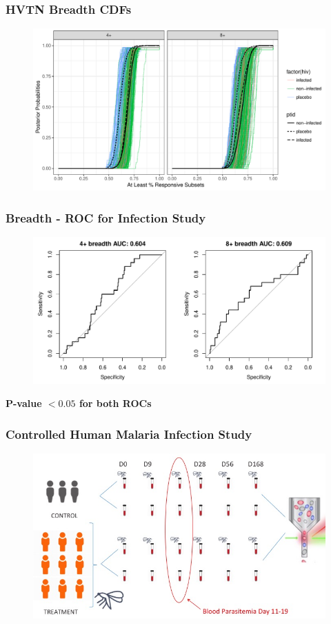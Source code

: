 \documentclass{beamer}
\theoremstyle{definition}
\begin{document}

\begin{frame}
\frametitle{HVTN Breadth CDFs}
\begin{figure}
\includegraphics[width=11 cm]{figures/HVTNbreadthCDFs}
\end{figure}
\end{frame}


\begin{frame}
\frametitle{Breadth - ROC for Infection Study}
\begin{figure}
\includegraphics[width=11 cm]{figures/HVTNbreadthROCinfection}
\end{figure}
\textbf{P-value $< 0.05$ for both ROCs}
\end{frame}







\begin{frame}
\frametitle{Controlled Human Malaria Infection Study}
\begin{figure}[]
\includegraphics[width=11 cm]{figures/malariaGraphic}
\end{figure}
\end{frame}
\end{document}
